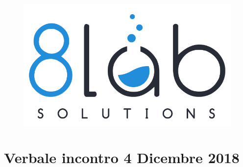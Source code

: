 \documentclass[a4paper]{article}
\begin{document}
\begin{figure}
\centering
\includegraphics[scale=0.07]{../res/images/logo8_crop.png}
\end{figure}

\section*{Verbale incontro 4 Dicembre 2018}
\end{document}
